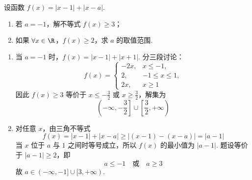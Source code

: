 \begin{problem}
设函数 \(f(x) = |x - 1| + |x - a|\).
\begin{enumerate}
\item 若 \(a = -1\)，解不等式 \(f(x) \geqslant 3\)；
\item 如果 \(\forall x \in \R\)，\(f(x) \geqslant 2\)，求 \(a\) 的取值范围.
\end{enumerate}
\end{problem}

\begin{solution}
\begin{enumerate}
\item 当 \(a=-1\) 时，\(f(x)=|x-1|+|x+1|\). 分三段讨论：
\[
f(x)=
\begin{cases}
-2x,&x\leqslant-1,\\
2,&-1\leqslant x\leqslant1,\\
2x,&x\geqslant1
\end{cases}
\]
因此 \(f(x)\geqslant3\) 等价于 \(x\leqslant-\frac32\) 或 \(x\geqslant\frac32\)，解集为
\[
\left(-\infty,-\frac32\right]\cup\left[\frac32,+\infty\right)
\]
\item 对任意 \(x\)，由三角不等式
\[
f(x)=|x-1|+|x-a|\geqslant|(x-1)-(x-a)|=|a-1|
\]
当 \(x\) 位于 \(a\) 与 \(1\) 之间时等号成立，所以 \(f(x)\) 的最小值为 \(|a-1|\). 题设等价于 \(|a-1|\geqslant2\)，即
\[
a\leqslant-1\quad\text{或}\quad a\geqslant3
\]
故 \(a\in(-\infty,-1]\cup[3,+\infty)\).
\end{enumerate}
\end{solution}
